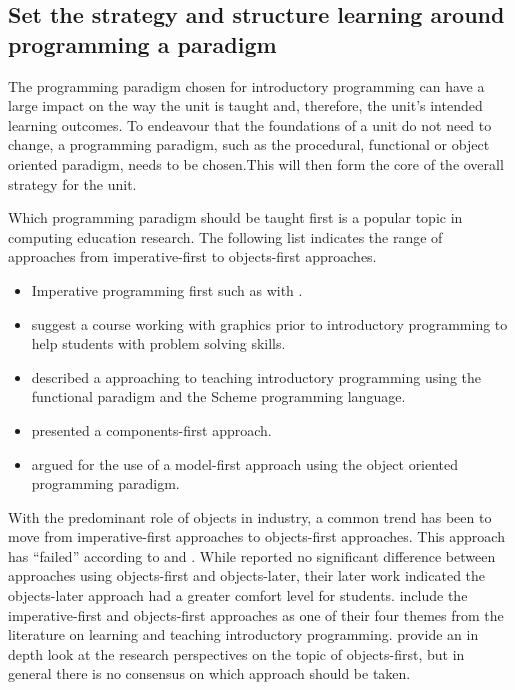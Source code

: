 \subsection{Set the strategy and structure learning around programming a paradigm} %
\label{ssub:strategy_around_paradigm}

The programming paradigm chosen for introductory programming can have a large impact on the way the unit is taught and, therefore, the unit's intended learning outcomes. To endeavour that the foundations of a unit do not need to change, a programming paradigm, such as the procedural, functional or object oriented paradigm, needs to be chosen.This will then form the core of the overall strategy for the unit.

Which programming paradigm should be taught first is a popular topic in computing education research. The following list indicates the range of approaches from imperative-first to objects-first approaches.
\begin{itemize}[noitemsep,nolistsep]
	\item Imperative programming first such as with \citet{Koffman:1988a}.
	\item \citet{Cooper:2003} suggest a course working with graphics prior to introductory programming to help students with problem solving skills.
	\item \citet{Felleisen:2004} described a approaching to teaching introductory programming using the functional paradigm and the Scheme programming language.
	\item \citet{Howe:2004} presented a components-first approach.
	\item \citet{Bennedsen:2004} argued for the use of a model-first approach using the object oriented programming paradigm.
\end{itemize}

 With the predominant role of objects in industry, a common trend has been to move from imperative-first approaches to objects-first approaches. This approach has ``failed'' according to \citet{Astrachan:2005} and \citet{Reges:2006}. While \citet{Ehlert:2009} reported no significant difference between approaches using objects-first and objects-later, their later work \cite{Ehlert:2010} indicated the objects-later approach had a greater comfort level for students. \citet{Robins:2003} include the imperative-first and objects-first approaches as one of their four themes from the literature on learning and teaching introductory programming. \citet{Lister:2006a} provide an in depth look at the research perspectives on the topic of objects-first, but in general there is no consensus on which approach should be taken.

